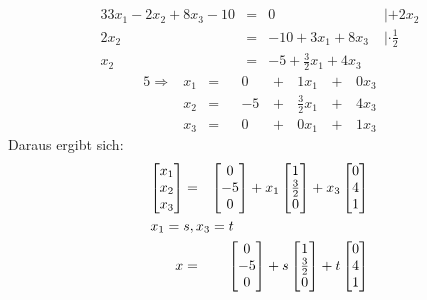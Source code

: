 \documentclass[10pt,a4paper,oneside,ngerman,numbers=noenddot]{scrartcl}
\begin{document}
\section{} %
\begin{alignat*}{3}
3x_{1} - 2x_{2} + 8x_{3} - 10 &=& 0 & \;| + 2x_{2} \\
2x_{2} &=& -10 + 3x_{1} + 8x_{3} & \;| \cdot \frac{1}{2} \\
x_{2} &=& -5 + \frac{3}{2}x_{1} + 4x_{3} &
\end{alignat*}
\begin{alignat*}{5}
\Rightarrow & x_{1} &=&& 0 &\,+\,& 1x_{1} &\,+\,& 0x_{3} \\
& x_{2} &=&& -5 &\,+\,& \frac{3}{2}x_{1} &\,+\,& 4x_{3}\\
& x_{3} &=&& 0 &\,+\,& 0x_{1} &\,+\,& 1x_{3}
\end{alignat*}
Daraus ergibt sich:\\
\begin{alignat*}{2}
\begin{bmatrix}
x_{1} \\
x_{2} \\
x_{3}
\end{bmatrix} &=& 
\begin{bmatrix}
0 \\
-5 \\
0
\end{bmatrix} + x_{1}
\begin{bmatrix}
1 \\
\frac{3}{2} \\
0
\end{bmatrix} + x_{3}
\begin{bmatrix}
0 \\
4 \\
1
\end{bmatrix} \\
\intertext{$x_{1} = s, x_{3} = t$}
x &=& 
\begin{bmatrix}
0 \\
-5 \\
0
\end{bmatrix} + s
\begin{bmatrix}
1 \\
\frac{3}{2} \\
0
\end{bmatrix} + t
\begin{bmatrix}
0 \\
4 \\
1
\end{bmatrix}
\end{alignat*}
\end{document}
